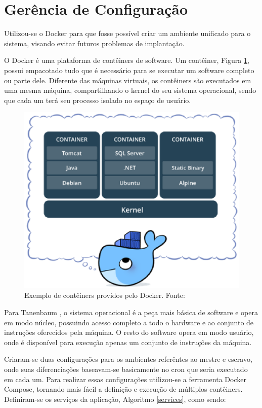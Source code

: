 \section{Gerência de Configuração}
Utilizou-se o Docker \cite{docker} para que fosse possível criar um ambiente unificado para o sistema, visando evitar futuros problemas de implantação.

O Docker é uma plataforma de contêiners de software. Um contêiner, Figura \ref{container}, possui empacotado tudo que é necessário para se executar um software completo ou parte dele. Diferente das máquinas virtuais, os contêiners são executados em uma mesma máquina, compartilhando o kernel do seu sistema operacional, sendo que cada um terá seu processo isolado no espaço de usuário.

\begin{figure}[!h]
    \centering
    \includegraphics[keepaspectratio=true,scale=0.8]{figuras/container.eps}
    \caption{Exemplo de contêiners providos pelo Docker. Fonte: \cite{docker} }
    \label{container}
\end{figure}

Para Tanenbaum \cite{tanenbaum_2007}, o sistema operacional é a peça mais básica de software e opera em modo núcleo, possuindo acesso completo a todo o hardware e ao conjunto de instruções oferecidos pela máquina. O resto do software opera em modo usuário, onde é disponível para execução apenas um conjunto de instruções da máquina.

Criaram-se duas configurações para os ambientes referêntes ao mestre e escravo, onde suas diferenciações baseavam-se basicamente no cron que seria executado em cada um. Para realizar essas configurações utilizou-se a ferramenta Docker Compose, tornando mais fácil a definição e execução de múltiplos contêiners. Definiram-se os serviços da aplicação, Algoritmo \ref{services}, como sendo:

